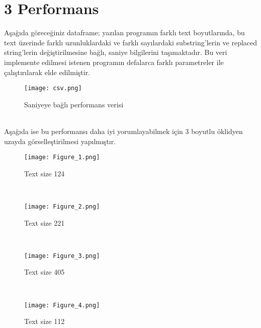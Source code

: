 \documentclass[11pt]{article}
\begin{document}
\section{3 Performans}
\hspace*{1cm} Aşağıda göreceğiniz dataframe; yazılan programın farklı text boyutlarında, bu text üzerinde farklı uzunluklardaki ve farklı sayılardaki substring'lerin ve replaced string'lerin değiştirilmesine bağlı, saniye bilgilerini taşımaktadır. Bu veri implemente edilmesi istenen programın defalarca farklı parametreler ile çalıştırılarak elde edilmiştir.
\begin{figure}[h!]
\centering
\texttt{[image: csv.png]}
\caption{Saniyeye bağlı performans verisi}
\label{fig:csv}
\end{figure}\\
Aşağıda ise bu performansı daha iyi yorumlayabilmek için 3 boyutlu öklidyen uzayda görselleştirilmesi yapılmıştır. 
\begin{figure}[h!]
\centering
\texttt{[image: Figure\_1.png]}
\caption{Text size 124}
\label{fig:124}
\end{figure}\\
\begin{figure}[h!]
\centering
\texttt{[image: Figure\_2.png]}
\caption{Text size 221}
\label{fig:221}
\end{figure}\\
\begin{figure}[h!]
\centering
\texttt{[image: Figure\_3.png]}
\caption{Text size 405}
\label{fig:405}
\end{figure}\\
\begin{figure}[t]
\texttt{[image: Figure\_4.png]}
\caption{Text size 112}
\label{fig:112}
\end{figure}\\
\end{document}
